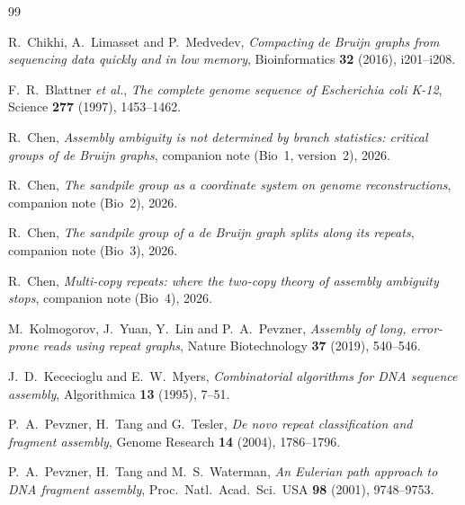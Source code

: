 \documentclass[11pt]{article}
\theoremstyle{plain}
\theoremstyle{definition}
\theoremstyle{remark}
\begin{document}
\begin{thebibliography}{99}

 R.~Chikhi, A.~Limasset and P.~Medvedev,
\emph{Compacting de Bruijn graphs from sequencing data quickly and in low memory},
Bioinformatics \textbf{32} (2016), i201--i208.

 F.~R.~Blattner \emph{et al.},
\emph{The complete genome sequence of Escherichia coli K-12},
Science \textbf{277} (1997), 1453--1462.

 R.~Chen,
\emph{Assembly ambiguity is not determined by branch statistics: critical groups of de
Bruijn graphs}, companion note (Bio~1, version~2), 2026.

 R.~Chen,
\emph{The sandpile group as a coordinate system on genome reconstructions}, companion
note (Bio~2), 2026.

 R.~Chen,
\emph{The sandpile group of a de Bruijn graph splits along its repeats}, companion note
(Bio~3), 2026.

 R.~Chen,
\emph{Multi-copy repeats: where the two-copy theory of assembly ambiguity stops},
companion note (Bio~4), 2026.

 M.~Kolmogorov, J.~Yuan, Y.~Lin and P.~A.~Pevzner,
\emph{Assembly of long, error-prone reads using repeat graphs},
Nature Biotechnology \textbf{37} (2019), 540--546.

 J.~D.~Kececioglu and E.~W.~Myers,
\emph{Combinatorial algorithms for DNA sequence assembly},
Algorithmica \textbf{13} (1995), 7--51.

 P.~A.~Pevzner, H.~Tang and G.~Tesler,
\emph{De novo repeat classification and fragment assembly},
Genome Research \textbf{14} (2004), 1786--1796.

 P.~A.~Pevzner, H.~Tang and M.~S.~Waterman,
\emph{An Eulerian path approach to DNA fragment assembly},
Proc.\ Natl.\ Acad.\ Sci.\ USA \textbf{98} (2001), 9748--9753.

\end{thebibliography}
\end{document}
